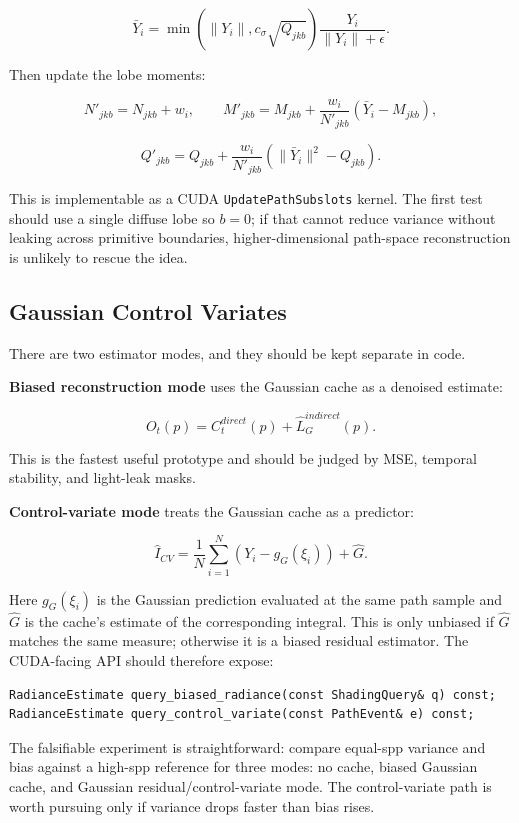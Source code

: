 \documentclass[11pt]{article}
\begin{document}
\[
  \bar{Y}_i =
  \min(\|Y_i\|, c_\sigma\sqrt{Q_{jkb}})\frac{Y_i}{\|Y_i\|+\epsilon}.
\]

Then update the lobe moments:

\[
  N'_{jkb}=N_{jkb}+w_i,
  \qquad
  M'_{jkb}=M_{jkb}+\frac{w_i}{N'_{jkb}}(\bar{Y}_i-M_{jkb}),
\]

\[
  Q'_{jkb}=Q_{jkb}+\frac{w_i}{N'_{jkb}}(\|\bar{Y}_i\|^2-Q_{jkb}).
\]

This is implementable as a CUDA \texttt{UpdatePathSubslots} kernel.
The first test should use a single diffuse lobe so $b=0$; if that cannot reduce
variance without leaking across primitive boundaries, higher-dimensional
path-space reconstruction is unlikely to rescue the idea.

\subsection{Gaussian Control Variates}

There are two estimator modes, and they should be kept separate in code.

\textbf{Biased reconstruction mode} uses the Gaussian cache as a denoised
estimate:

\[
  O_t(p) =
  C^{direct}_t(p) + \hat{L}^{indirect}_G(p).
\]

This is the fastest useful prototype and should be judged by MSE, temporal
stability, and light-leak masks.

\textbf{Control-variate mode} treats the Gaussian cache as a predictor:

\[
  \hat{I}_{CV} =
  \frac{1}{N}\sum_{i=1}^N
  \left(Y_i - g_G(\xi_i)\right)
  + \hat{G}.
\]

Here $g_G(\xi_i)$ is the Gaussian prediction evaluated at the same path sample
and $\hat{G}$ is the cache's estimate of the corresponding integral. This is
only unbiased if $\hat{G}$ matches the same measure; otherwise it is a biased
residual estimator. The CUDA-facing API should therefore expose:

\begin{verbatim}
RadianceEstimate query_biased_radiance(const ShadingQuery& q) const;
RadianceEstimate query_control_variate(const PathEvent& e) const;
\end{verbatim}

The falsifiable experiment is straightforward: compare equal-spp variance and
bias against a high-spp reference for three modes: no cache, biased Gaussian
cache, and Gaussian residual/control-variate mode. The control-variate path is
worth pursuing only if variance drops faster than bias rises.
\end{document}
